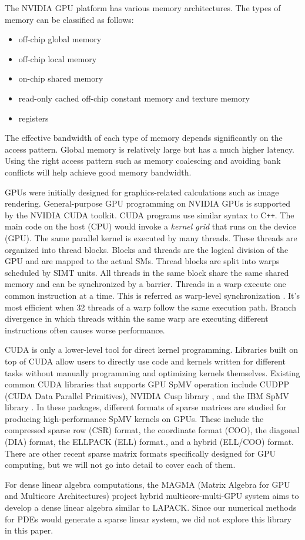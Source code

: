 The NVIDIA GPU platform has various memory architectures. The types of memory can be classified as follows:
\begin{itemize}
    \item off-chip global memory
    \item off-chip local memory
    \item on-chip shared memory
    \item read-only cached off-chip constant memory and texture memory
    \item registers
\end{itemize}

The effective bandwidth of each type of memory depends significantly on the access pattern. Global memory is relatively large but has a much higher latency. Using the right access pattern such as memory coalescing and avoiding bank conflicts will help achieve good memory bandwidth.


GPUs were initially designed for graphics-related calculations such as image rendering. General-purpose GPU programming on NVIDIA GPUs is supported by the NVIDIA CUDA toolkit. CUDA programs use similar syntax to C\texttt{++}. The main code on the host (CPU) would invoke a \textit{kernel grid} that runs on the device (GPU). The same parallel kernel is executed by many threads. These threads are organized into thread blocks. Blocks and threads are the logical division of the GPU and are mapped to the actual SMs. Thread blocks are split into warps scheduled by SIMT units. All threads in the same block share the same shared memory and can be synchronized by a barrier. Threads in a warp execute one common instruction at a time. This is referred as warp-level synchronization \citep{wilt2013cuda}. It's most efficient when 32 threads of a warp follow the same execution path. Branch divergence in which threads within the same warp are executing different instructions often causes worse performance.

CUDA is only a lower-level tool for direct kernel programming. Libraries built on top of CUDA allow users to directly use code and kernels written for different tasks without manually programming and optimizing kernels themselves. Existing common CUDA libraries that supports GPU SpMV operation include CUDPP (CUDA Data Parallel Primitives)\citep{harris2007cudpp}, NVIDIA Cusp library \citep{dalton2014cusp}, and the IBM SpMV library \citep{baskaran2009optimizing}. In these packages, different formats of sparse matrices are studied for producing high-performance SpMV kernels on GPUs. These include the compressed sparse row (CSR) format, the coordinate format (COO), the diagonal (DIA) format, the ELLPACK (ELL) format., and a hybrid (ELL/COO) format. There are other recent sparse matrix formats specifically designed for GPU computing, but we will not go into detail to cover each of them.

For dense linear algebra computations, the MAGMA (Matrix Algebra for GPU and Multicore Architectures) project hybrid multicore-multi-GPU system aims to develop a dense linear algebra similar to LAPACK\citep{agullo2009numerical}. Since our numerical methods for PDEs would generate a sparse linear system, we did not explore this library in this paper.


